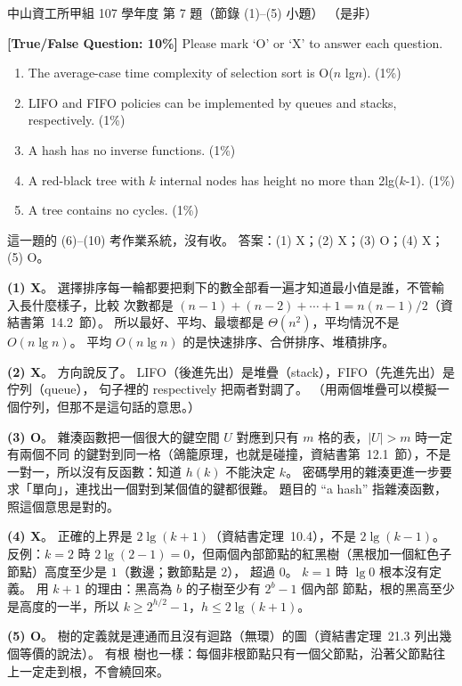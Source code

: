 \begin{pastexam}[label={px:nsysu-107-osds-03}]{中山資工所甲組 107 學年度 第 7 題（節錄 (1)--(5) 小題）}
（是非）

\textbf{[True/False Question: 10\%]} Please mark `O' or `X' to answer each question.
\begin{enumerate}[label=(\arabic*)]
\item The average-case time complexity of selection sort is O($n$ lg$n$). (1\%)
\item LIFO and FIFO policies can be implemented by queues and stacks, respectively. (1\%)
\item A hash has no inverse functions. (1\%)
\item A red-black tree with $k$ internal nodes has height no more than 2lg($k$-1). (1\%)
\item A tree contains no cycles. (1\%)
\end{enumerate}
\end{pastexam}

\begin{pastsoln}
這一題的 (6)--(10) 考作業系統，沒有收。 答案：(1) X；(2) X；(3) O；(4) X；(5) O。

\textbf{(1) X}。 選擇排序每一輪都要把剩下的數全部看一遍才知道最小值是誰，不管輸入長什麼樣子，比較
次數都是 $(n-1) + (n-2) + \cdots + 1 = n(n-1)/2$（資結書第~14.2~節）。 所以最好、平均、最壞都是
$\Theta(n^2)$，平均情況不是 $O(n \lg n)$。 平均 $O(n \lg n)$ 的是快速排序、合併排序、堆積排序。

\textbf{(2) X}。 方向說反了。 LIFO（後進先出）是堆疊（stack），FIFO（先進先出）是佇列（queue），
句子裡的 respectively 把兩者對調了。 （用兩個堆疊可以模擬一個佇列，但那不是這句話的意思。）

\textbf{(3) O}。 雜湊函數把一個很大的鍵空間 $U$ 對應到只有 $m$ 格的表，$|U| > m$ 時一定有兩個不同
的鍵對到同一格（鴿籠原理，也就是碰撞，資結書第~12.1~節），不是一對一，所以沒有反函數：知道
$h(k)$ 不能決定 $k$。 密碼學用的雜湊更進一步要求「單向」，連找出一個對到某個值的鍵都很難。 題目的
``a hash'' 指雜湊函數，照這個意思是對的。

\textbf{(4) X}。 正確的上界是 $2\lg(k + 1)$（資結書定理~10.4），不是 $2\lg(k - 1)$。 反例：$k = 2$ 時
$2\lg(2 - 1) = 0$，但兩個內部節點的紅黑樹（黑根加一個紅色子節點）高度至少是 $1$（數邊；數節點是 $2$），
超過 $0$。 $k = 1$ 時 $\lg 0$ 根本沒有定義。 用 $k + 1$ 的理由：黑高為 $b$ 的子樹至少有 $2^b - 1$ 個內部
節點，根的黑高至少是高度的一半，所以 $k \ge 2^{h/2} - 1$，$h \le 2\lg(k+1)$。

\textbf{(5) O}。 樹的定義就是連通而且沒有迴路（無環）的圖（資結書定理~21.3 列出幾個等價的說法）。 有根
樹也一樣：每個非根節點只有一個父節點，沿著父節點往上一定走到根，不會繞回來。
\end{pastsoln}
